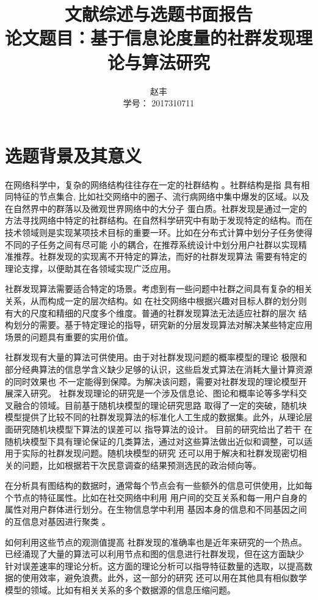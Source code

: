 \documentclass{ctexart}
\title{文献综述与选题书面报告 \\ \normalsize{论文题目：基于信息论度量的社群发现理论与算法研究 }
}
\author{赵丰 \\ 学号： 2017310711}
\begin{document}
\maketitle
\section{选题背景及其意义}
在网络科学中，复杂的网络结构往往存在一定的社群结构 \cite{fortunato2010community} 。社群结构是指
具有相同特征的节点集合,
比如社交网络中的圈子、流行病网络中集中爆发的区域。以及在自然界中的群落以及微观世界网络中的大分子
蛋白质。社群发现是通过一定的方法寻找网络中特定的社群结构。在自然科学研究中有助于发现特定的结构。而在
技术领域则是实现某项技术目标的重要一环。比如在分布式计算中划分子任务使得不同的子任务之间有尽可能
小的耦合，在推荐系统设计中划分用户社群以实现精准推荐。社群发现的实现离不开特定的算法，而好的社群发现算法
需要有特定的理论支撑，以便助其在各领域实现广泛应用。

社群发现算法需要适合特定的场景。考虑到有一些问题中社群之间具有复杂的相关关系，从而构成一定的层次结构。如
在社交网络中根据兴趣对目标人群的划分则有大的尺度和精细的尺度多个维度。普通的社群发现算法无法适应社群的层次
结构划分的需要。基于特定理论的指导，研究新的分层发现算法对解决某些特定应用场景的问题具有重要的实用价值。

社群发现有大量的算法可供使用。由于对社群发现问题的概率模型的理论
极限和部分经典算法的信息学含义缺少足够的认识，这些启发式算法在消耗大量计算资源的同时效果也
不一定能得到保障。为解决该问题，需要对社群发现的理论模型开展深入研究。
社群发现理论的研究是一个涉及信息论、图论和概率论等多学科交叉融合的领域。目前基于随机块模型的理论研究思路
取得了一定的突破，随机块模型提供了比较不同的社群发现算法的标准化人工生成的数据集。此外，从理论层面研究随机块模型下算法的误差可以
指导算法的设计。
目前的研究给出了若干
在随机块模型下具有理论保证的几类算法，通过对这些算法做出近似和调整，可以适用于实际的社群发现问题。随机块模型的研究
还可以用于解决和社群发现密切相关的问题，比如根据若干次民意调查的结果预测选民的政治倾向等。

在分析具有图结构的数据时，通常每个节点会有一些额外的信息可供使用，比如每个节点的特征属性。比如在社交网络中利用
用户间的交互关系和每一用户自身的属性对用户群体进行划分。在生物信息学中利用
基因本身的信息和不同基因之间的互信息对基因进行聚类 \cite{4359897}。

如何利用这些节点的观测值提高
社群发现的准确率也是近年来研究的一个热点。已经涌现了大量的算法可以利用节点和图的信息进行社群发现，但在这方面缺少
针对误差速率的理论分析。这方面的理论分析可以指导特征数量的选取，以提高数据的使用效率，避免浪费。此外，这一部分的研究
还可以用在其他具有相似数学模型的领域。比如有相关关系的多个数据源的信息压缩问题。
\end{document}
